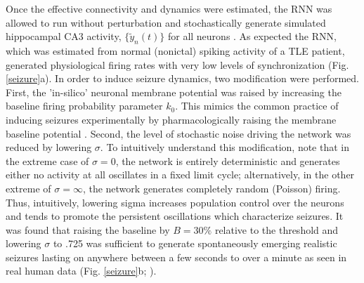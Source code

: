 \documentclass[11pt,a4paper,final]{article}
\begin{document}
Once the effective connectivity and dynamics were estimated, the RNN was allowed to run without perturbation and stochastically generate simulated hippocampal CA3 activity, $\{\tilde{y}_n(t)\}$ for all \nn{} neurons \citep{pillow08}.
As expected the RNN, which was estimated from normal (nonictal) spiking activity of a TLE patient, generated physiological firing rates with very low levels of synchronization (Fig. \ref{seizure}a).
In order to induce seizure dynamics, two modification were performed.
First, the 'in-silico' neuronal membrane potential was raised by increasing the baseline firing probability parameter $k_0$.
This mimics the common practice of inducing seizures experimentally by pharmacologically raising the membrane baseline potential \citep{fricker99,avoli02}.
Second, the level of stochastic noise driving the network was reduced by lowering $\sigma$.
To intuitively understand this modification, note that in the extreme case of $\sigma=0$, the network is entirely deterministic and generates either no activity at all oscillates in a fixed limit cycle;
alternatively, in the other extreme of $\sigma=\infty$, the network generates completely random (Poisson) firing.
Thus, intuitively, lowering sigma increases population control over the neurons and tends to promote the persistent oscillations which characterize seizures.
It was found that raising the baseline by $B=30\%$ relative to the threshold and lowering $\sigma$ to .725 was sufficient to generate spontaneously emerging realistic seizures lasting on anywhere between a few seconds to over a minute as seen in real human data (Fig. \ref{seizure}b; \citet{bower12,truccolo14}).	
\end{document}
